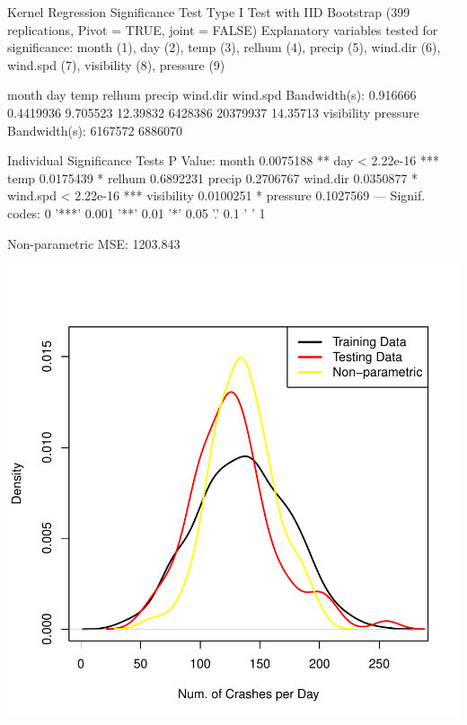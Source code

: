 \documentclass[11pt, a4paper]{article}
\begin{document}
\begin{Schunk}
\begin{Soutput}
Kernel Regression Significance Test
Type I Test with IID Bootstrap (399 replications, Pivot = TRUE, joint = FALSE)
Explanatory variables tested for significance:
month (1), day (2), temp (3), relhum (4), precip (5), wind.dir (6), wind.spd (7), visibility (8), pressure (9)

                 month       day     temp   relhum  precip wind.dir wind.spd
Bandwidth(s): 0.916666 0.4419936 9.705523 12.39832 6428386 20379937 14.35713
              visibility pressure
Bandwidth(s):    6167572  6886070

Individual Significance Tests
P Value: 
month      0.0075188 ** 
day        < 2.22e-16 *** 
temp       0.0175439 * 
relhum     0.6892231  
precip     0.2706767  
wind.dir   0.0350877 * 
wind.spd   < 2.22e-16 *** 
visibility 0.0100251 * 
pressure   0.1027569 
---
Signif. codes:  0 '***' 0.001 '**' 0.01 '*' 0.05 '.' 0.1 ' ' 1
\end{Soutput}
\begin{Soutput}
Non-parametric MSE: 1203.843
\end{Soutput}
\end{Schunk}
\includegraphics{regression-020}




\pagebreak
\end{document}
